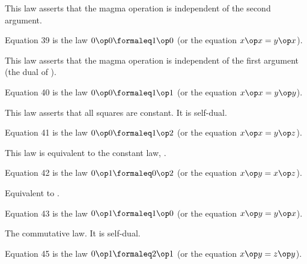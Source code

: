 This law asserts that the magma operation is independent of the second argument.

\begin{definition}[Equation 39]\label{eq39}\leanok{}  Equation 39 is the law $0 \op 0  \formaleq  1 \op 0$ (or the equation $x \op x = y \op x$).
\end{definition}

This law asserts that the magma operation is independent of the first argument (the dual of ).

\begin{definition}[Equation 40]\label{eq40}\leanok{}  Equation 40 is the law $0 \op 0  \formaleq  1 \op 1$ (or the equation $x \op x = y \op y$).
\end{definition}

This law asserts that all squares are constant. It is self-dual.

\begin{definition}[Equation 41]\label{eq41}\leanok{}  Equation 41 is the law $0 \op 0  \formaleq  1 \op 2$ (or the equation $x \op x = y \op z$).
\end{definition}

This law is equivalent to the constant law, .

\begin{definition}[Equation 42]\label{eq42}\leanok{}  Equation 42 is the law $0 \op 1  \formaleq  0 \op 2$ (or the equation $x \op y = x \op z$).
\end{definition}

Equivalent to .

\begin{definition}[Equation 43]\label{eq43}\leanok{}  Equation 43 is the law $0 \op 1  \formaleq  1 \op 0$ (or the equation $x \op y = y \op x$).
\end{definition}

The commutative law. It is self-dual.

\begin{definition}[Equation 45]\label{eq45}\leanok{}  Equation 45 is the law $0 \op 1  \formaleq  2 \op 1$ (or the equation $x \op y = z \op y$).
\end{definition}

